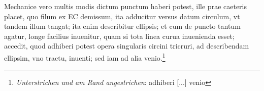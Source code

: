 \pend \pstart [p.~73] Mechanice vero multis modis dictum punctum haberi potest, ille prae caeteris placet, quo filum ex EC demissum, ita adducitur versus datum circulum, vt tandem illum tangat; ita enim describitur ellipsis; et cum de puncto tantum agatur, longe facilius inuenitur, quam si tota linea curua inuenienda esset; accedit, quod adhiberi potest opera singularis circini tricruri, ad describendam ellipsim, vno tractu, inuenti; sed iam ad alia venio.\footnote{\textit{Unterstrichen und am Rand angestrichen}: adhiberi [...] venio }